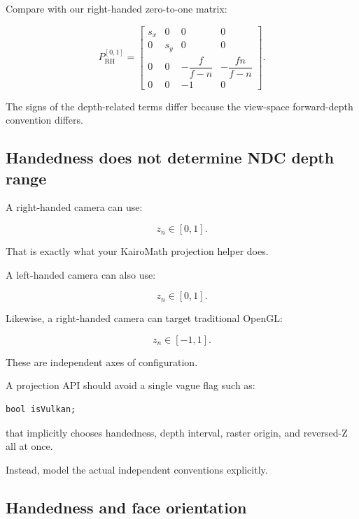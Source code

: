 Compare with our right-handed zero-to-one matrix:

\[
 P_{\mathrm{RH}}^{[0,1]}= \begin{bmatrix} s_x&0&0&0\\ 0&s_y&0&0\\ 0&0&-\dfrac f{f-n}&-\dfrac{fn}{f-n}\\ 0&0&-1&0 \end{bmatrix}.
\]

The signs of the depth-related terms differ because the view-space forward-depth convention differs.

\subsection{Handedness does not determine NDC depth range}\label{02-foundations-ii-ch033-handedness-does-not-determine-ndc-depth-range}

\hypertarget{02-foundations-ii-ch033-handedness-does-not-determine-ndc-depth-range}{}

A right-handed camera can use:

\[
 z_n\in[0,1].
\]

That is exactly what your KairoMath projection helper does.

A left-handed camera can also use:

\[
 z_n\in[0,1].
\]

Likewise, a right-handed camera can target traditional OpenGL:

\[
 z_n\in[-1,1].
\]

These are independent axes of configuration.

A projection API should avoid a single vague flag such as:

\begin{verbatim}
bool isVulkan;
\end{verbatim}

that implicitly chooses handedness, depth interval, raster origin, and reversed-Z all at once.

Instead, model the actual independent conventions explicitly.

\subsection{Handedness and face orientation}\label{02-foundations-ii-ch033-handedness-and-face-orientation}

\hypertarget{02-foundations-ii-ch033-handedness-and-face-orientation}{}


